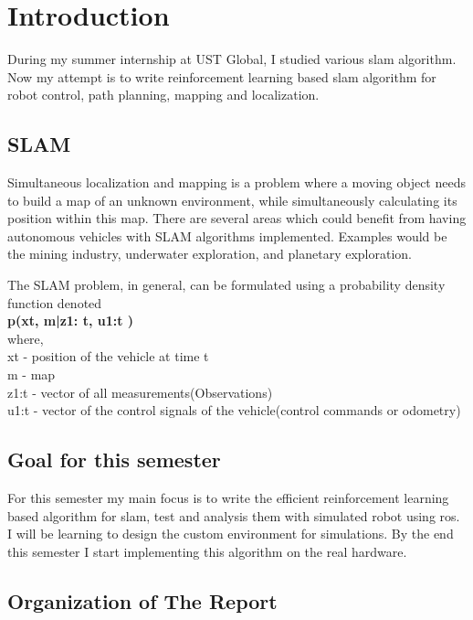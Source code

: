 \chapter{Introduction}
\hspace{3mm}

During my summer internship at UST Global, I studied various slam algorithm. Now my attempt is to write reinforcement learning based slam algorithm for robot control, path planning, mapping and localization.

\section{SLAM}
Simultaneous localization and mapping is a problem where a moving object needs to build a map of an unknown environment, while simultaneously calculating its position within this map. There are several areas which could benefit from having autonomous vehicles with SLAM algorithms implemented. Examples would be the mining industry, underwater exploration, and planetary exploration. 

The SLAM problem, in general, can be formulated using a probability density function denoted 
\\\textbf{p(xt, m|z1: t, u1:t )}
\\where,
\\xt       -  position of the vehicle at time t
\\m       -  map
\\z1:t    -  vector of all measurements(Observations)
\\u1:t    - vector of the control signals of the vehicle(control commands or odometry)


\section{Goal for this semester}

For this semester my main focus is to write the efficient reinforcement learning based algorithm for slam, test and analysis them with simulated robot using ros.
I will be learning to design the custom environment for simulations.
By the end this semester I start implementing this algorithm on the real hardware.

\section{Organization of The Report}

